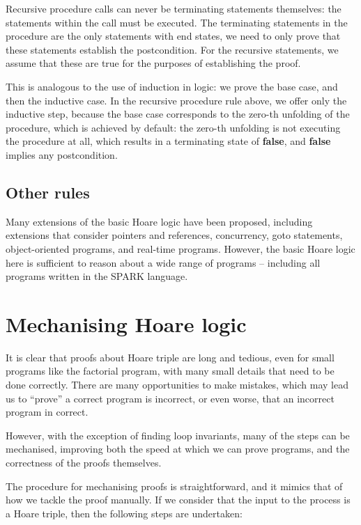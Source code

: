 Recursive procedure calls can never be terminating statements themselves: the statements within the call must be executed. The terminating statements in the procedure are the only statements with end states, we need to only prove that these statements establish the postcondition. For the recursive statements, we assume that these are true for the purposes of establishing the proof. 

This is analogous to the use of induction in logic: we prove the base case, and then the inductive case. In the recursive procedure rule above, we offer only the inductive step, because the base case corresponds to the zero-th unfolding of the procedure, which is achieved by default: the zero-th unfolding is not executing the procedure at all, which results in a terminating state of \textbf{false}, and \textbf{false} implies any postcondition.

\subsection{Other rules}

Many extensions of the basic Hoare logic have been proposed, including extensions that consider pointers and references, concurrency, goto statements, object-oriented programs, and real-time programs. However, the basic Hoare logic here is sufficient to reason about a wide range of programs -- including all programs written in the SPARK language.

\section{Mechanising Hoare logic}

It is clear that proofs about Hoare triple are long and tedious, even for small programs like the factorial program, with many small details that need to be done correctly. There are many opportunities to make mistakes, which may lead us to ``prove'' a correct program is incorrect, or even worse, that an incorrect program in correct.

However, with the exception of finding loop invariants, many of the steps can be mechanised, improving both the speed at which we can prove programs, and the correctness of the proofs themselves.

The procedure for mechanising proofs is straightforward, and it mimics that of how we tackle the proof manually. If we consider that the input to the process is a Hoare triple, then the following steps are undertaken:

